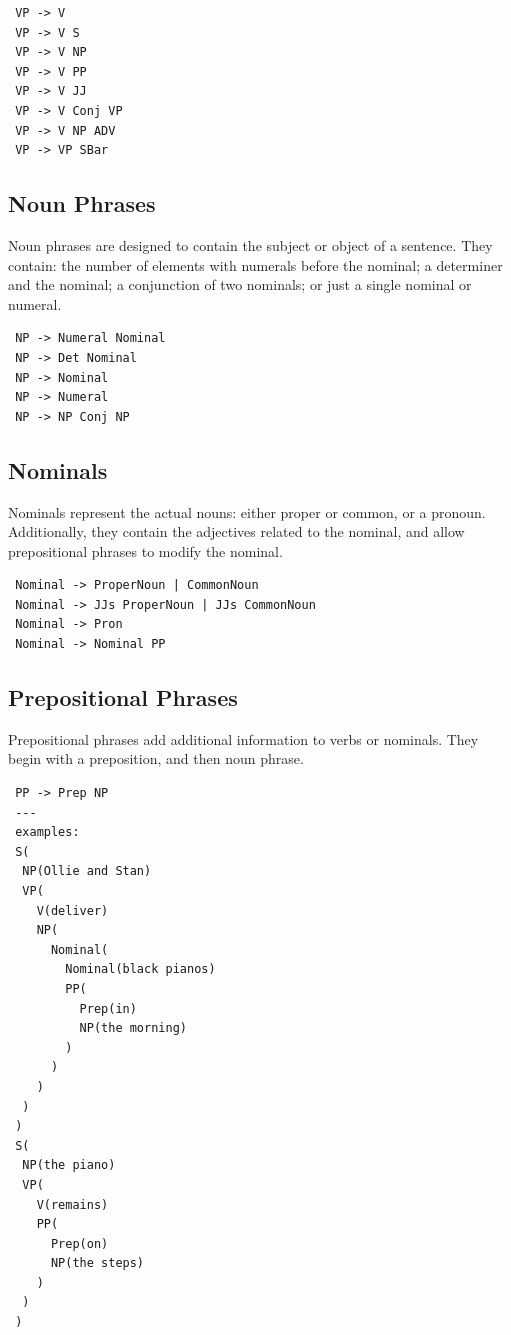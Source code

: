 \documentclass[12pt, a4paper]{article}
\begin{document}
\begin{lstlisting}
 VP -> V
 VP -> V S
 VP -> V NP
 VP -> V PP
 VP -> V JJ
 VP -> V Conj VP
 VP -> V NP ADV
 VP -> VP SBar
\end{lstlisting}

\subsection{Noun Phrases}

Noun phrases are designed to contain the subject or object of a sentence. They contain: the number of elements with numerals before the nominal; a determiner and the nominal; a conjunction of two nominals; or just a single nominal or numeral.

\begin{lstlisting}
 NP -> Numeral Nominal
 NP -> Det Nominal
 NP -> Nominal
 NP -> Numeral
 NP -> NP Conj NP
\end{lstlisting}

\subsection{Nominals}

Nominals represent the actual nouns: either proper or common, or a pronoun. Additionally, they contain the adjectives related to the nominal, and allow prepositional phrases to modify the nominal.

\begin{lstlisting}
 Nominal -> ProperNoun | CommonNoun
 Nominal -> JJs ProperNoun | JJs CommonNoun
 Nominal -> Pron
 Nominal -> Nominal PP
\end{lstlisting}

\subsection{Prepositional Phrases}

Prepositional phrases add additional information to verbs or nominals. They begin with a preposition, and then noun phrase.

\begin{lstlisting}
 PP -> Prep NP
 ---
 examples:
 S(
  NP(Ollie and Stan)
  VP(
    V(deliver)
    NP(
      Nominal(
        Nominal(black pianos)
        PP(
          Prep(in)
          NP(the morning)
        )
      )
    )
  )
 )
 S(
  NP(the piano)
  VP(
    V(remains)
    PP(
      Prep(on) 
      NP(the steps)
    )
  )
 )
\end{lstlisting}
\end{document}
